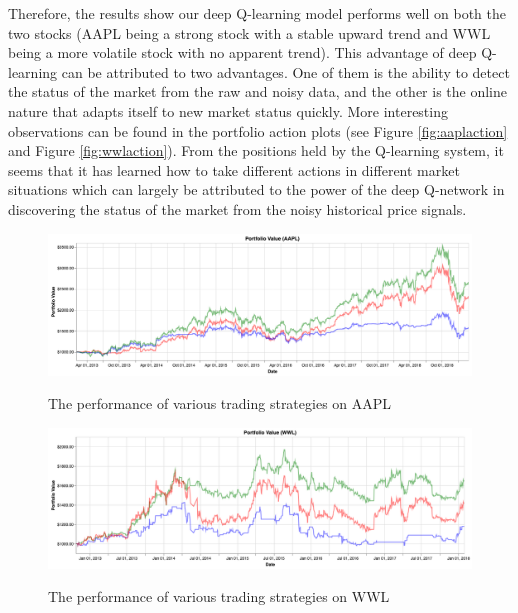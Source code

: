 \documentclass[12pt, authoryear]{elsarticle}
\begin{document}
Therefore, the results show our deep Q-learning model performs well on both the two stocks (AAPL being a strong stock with a stable upward trend and WWL being a more volatile stock with no apparent trend). This advantage of deep Q-learning can be attributed to two advantages. One of them is the ability to detect the status of the market from the raw and noisy data, and the other is the online nature that adapts itself to new market status quickly. More interesting observations can be found in the portfolio action plots (see Figure \ref{fig:aaplaction} and Figure \ref{fig:wwlaction}). From the positions held by the Q-learning system, it seems that it has learned how to take different actions in different market situations which can largely be attributed to the power of the deep Q-network in discovering the status of the market from the noisy historical price signals.

\begin{figure}[h!]
	\centering
	\caption{The performance of various trading strategies on AAPL}
	\includegraphics[width=\textwidth]{figures/aapl_portfolio.png}
	\label{fig:aapl}
\end{figure}


\begin{figure}[h!]
	\centering
	\caption{The performance of various trading strategies on WWL}
	\includegraphics[width=\textwidth]{figures/wwl_portfolio.png}
	\label{fig:wwl}
\end{figure}
\end{document}
